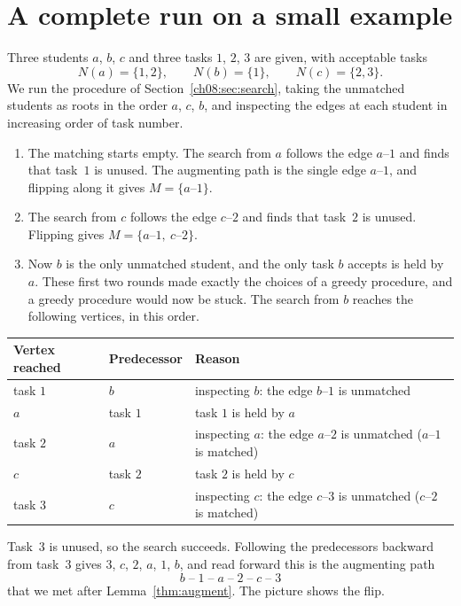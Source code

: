 \section{A complete run on a small example}\label{sec:matching-trace}
Three students $a$, $b$, $c$ and three tasks $1$, $2$, $3$ are given, with acceptable tasks
\[
N(a)=\{1,2\},\qquad N(b)=\{1\},\qquad N(c)=\{2,3\}.
\]
We run the procedure of Section~\ref{ch08:sec:search}, taking the unmatched students as roots in the order $a$, $c$, $b$, and inspecting the edges at each student in increasing order of task number.
\begin{enumerate}
\item The matching starts empty. The search from $a$ follows the edge $a$--$1$ and finds that task~$1$ is unused. The augmenting path is the single edge $a$--$1$, and flipping along it gives $M=\{a\text{--}1\}$.
\item The search from $c$ follows the edge $c$--$2$ and finds that task~$2$ is unused. Flipping gives $M=\{a\text{--}1,\ c\text{--}2\}$.
\item Now $b$ is the only unmatched student, and the only task $b$ accepts is held by $a$. These first two rounds made exactly the choices of a greedy procedure, and a greedy procedure would now be stuck. The search from $b$ reaches the following vertices, in this order.
\end{enumerate}
\begin{center}
\begin{tabularx}{\linewidth}{@{}llX@{}}
\toprule
Vertex reached & Predecessor & Reason\\
\midrule
task $1$ & $b$ & inspecting $b$: the edge $b$--$1$ is unmatched\\
$a$ & task $1$ & task $1$ is held by $a$\\
task $2$ & $a$ & inspecting $a$: the edge $a$--$2$ is unmatched ($a$--$1$ is matched)\\
$c$ & task $2$ & task $2$ is held by $c$\\
task $3$ & $c$ & inspecting $c$: the edge $c$--$3$ is unmatched ($c$--$2$ is matched)\\
\bottomrule
\end{tabularx}
\end{center}
Task~$3$ is unused, so the search succeeds. Following the predecessors backward from task~$3$ gives $3$, $c$, $2$, $a$, $1$, $b$, and read forward this is the augmenting path
\[
b\;\text{--}\;1\;\text{--}\;a\;\text{--}\;2\;\text{--}\;c\;\text{--}\;3
\]
that we met after Lemma~\ref{thm:augment}. The picture shows the flip.

